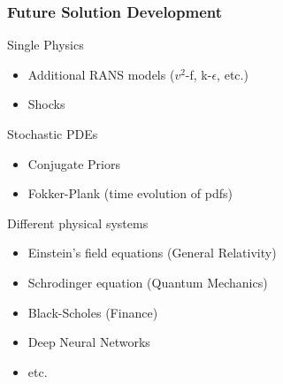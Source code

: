\documentclass[mathserif]{beamer}
\begin{document}
\begin{frame}
  \frametitle{Future Solution Development}

  \begin{block}{Single Physics}
    \begin{itemize}
    \item Additional RANS models ($v^2$-f, k-$\epsilon$, etc.)
    \item Shocks
    \end{itemize}
  \end{block}

  \begin{block}{Stochastic PDEs}    
    \begin{itemize}
     \item Conjugate Priors
     \item Fokker-Plank (time evolution of pdfs)
    \end{itemize}
  \end{block}

  \begin{block}{Different physical systems}
    \begin{itemize}
    \item Einstein's field equations (General Relativity)
    \item Schrodinger equation (Quantum Mechanics)
    \item Black-Scholes (Finance)
    \item Deep Neural Networks
    \item etc.
    \end{itemize}
  \end{block}

\end{frame}

\end{document}
